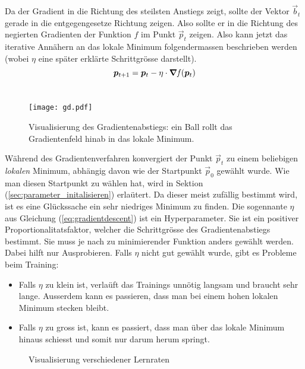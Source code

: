 \para{}
Da der Gradient in die Richtung des steilsten Anstiegs zeigt, sollte der Vektor
$\vec{b}_t$ gerade in die entgegengesetze Richtung zeigen. Also sollte er in die Richtung des negierten Gradienten der Funktion $f$ im Punkt $\vec{p}_t$ zeigen.
Also kann jetzt das iterative Annähern an das lokale Minimum folgendermassen beschrieben
werden (wobei $\eta$ eine später erklärte Schrittgrösse darstellt).
\\
\begin{equation}\label{eq:gradientdescent}
  \bm{p}_{t+1} = \bm{p}_t - \eta \cdot \bm{\nabla} \mathit{f}(\bm{p}_t)
\end{equation}
\\

\ifcp%
\begin{figure}[h!]
  \centering
  \texttt{[image: gd.pdf]}
  \caption{Visualisierung des Gradientenabstiegs: ein Ball rollt das
    Gradientenfeld hinab in das lokale Minimum.}
\end{figure}
\fi%

Während des Gradientenverfahren konvergiert der Punkt $\vec{p}_t$ zu einem
beliebigen \textit{lokalen} Minimum, abhängig davon wie der Startpunkt
$\vec{p}_0$ gewählt wurde.
Wie man diesen Startpunkt zu wählen hat, wird in Sektion
(\ref{sec:parameter_initalisieren}) erlaütert.
Da dieser meist zufällig bestimmt wird, ist es eine Glückssache ein sehr niedriges Minimum zu finden.
\para{}
Die sogennante  $\eta$ aus Gleichung (\ref{eq:gradientdescent}) ist ein Hyperparameter.
Sie ist ein positiver Proportionalitatsfaktor, welcher die Schrittgrösse des
Gradientenabstiegs bestimmt. Sie muss je nach zu minimierender Funktion anders gewählt werden.
Dabei hilft nur Ausprobieren. Falls $\eta$ nicht gut gewählt wurde, gibt es Probleme beim Training:
\begin{itemize}
\item{Falls $\eta$ zu klein ist, verlaüft das Trainings unnötig langsam und braucht sehr lange.
    Ausserdem kann es passieren, dass man bei einem hohen lokalen Minimum stecken bleibt.}

\item{Falls $\eta$ zu gross ist, kann es passiert, dass man über das lokale
    Minimum hinaus schiesst und somit nur darum herum springt.}
\end{itemize}

\begin{figure}[h!]
  \centering
  \caption{Visualisierung verschiedener Lernraten}
\end{figure}

